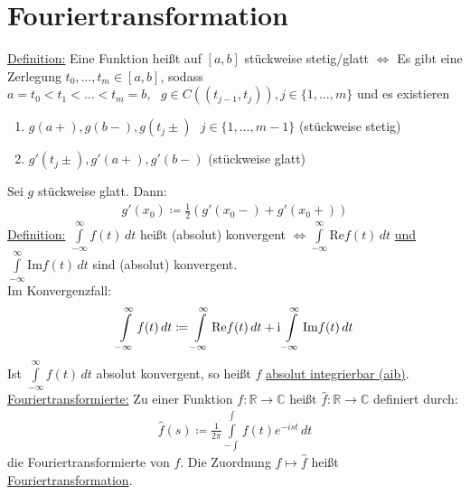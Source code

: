 \section{Fouriertransformation}
\underline{Definition:} Eine Funktion heißt auf $[a,b]$ stückweise stetig/glatt $\Leftrightarrow$ Es gibt eine Zerlegung $t_0, \ldots, t_m \in [a,b]$,
sodass $a=t_0 < t_1 < \ldots < t_m=b, \text{ } g \in C((t_{j-1},t_j)), j \in \{ 1, \ldots,m\}$ und es existieren
\begin{enumerate}
    \item $g(a+),g(b-),g(t_j\pm) \text{ } j \in \{ 1, \ldots, m-1\}$ (stückweise stetig)
    \item $g'(t_j \pm), g'(a+),g'(b-)$ (stückweise glatt)
\end{enumerate}
Sei $g$ stückweise glatt. Dann:
\begin{align*}
    g'(x_0) \coloneqq \frac{1}{2} (g'(x_0-) + g'(x_0+))
\end{align*}
\underline{Definition:} $\int \limits_{-\infty}^{\infty} f(t)\,dt$ heißt (absolut) konvergent $\Leftrightarrow \int \limits_{-\infty}^{\infty} \text{Re}f(t)\,dt$ 
\underline{und} $\int \limits_{-\infty}^{\infty} \text{Im}f(t)\,dt$ sind (absolut) konvergent. \\
Im Konvergenzfall: 
\begin{align*}
    \int \limits_{-\infty}^\infty f(t)\,dt \coloneqq  \int \limits_{-\infty}^\infty \text{Re} f(t)\,dt +  \text{i} \int \limits_{-\infty}^\infty \text{Im} f(t)\,dt
\end{align*} 
Ist $ \int \limits_{-\infty}^\infty f(t)\,dt$ absolut konvergent, so heißt $f$ \underline{absolut integrierbar (aib)}. \\
\underline{Fouriertransformierte:}
Zu einer Funktion $f: \mathbb{R} \to \mathbb{C}$ heißt $\widehat{f}:\mathbb{R} \to \mathbb{C}$ definiert durch:
\begin{align*}
    \widehat{f}(s) \coloneqq \frac{1}{2\pi} \int \limits_{-\int}^\int f(t) e^{-ist}\,dt
\end{align*}
die Fouriertransformierte von $f$. Die Zuordnung $f \mapsto \widehat{f}$ heißt \underline{Fouriertransformation}.

